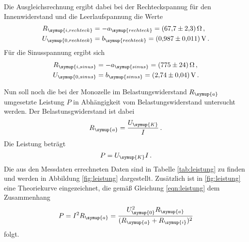 Die Ausgleichsrechnung ergibt dabei bei der Rechteckspannug für den Innenwiderstand
und die Leerlaufspannung die Werte
\begin{align*}
  R_{\symup{i,rechteck}}&=-a_{\symup{rechteck}} = \SI{67.7(23)}{\ohm} \,, \\
  U_{\symup{0,rechteck}}&=b_{\symup{rechteck}} = \SI{0.987(0011)}{\volt} \,.
\end{align*}
Für die Sinusspannung ergibt sich
\begin{align*}
  R_{\symup{i,sinus}}&=-a_{\symup{sinus}} = \SI{775(24)}{\ohm} \,, \\
  U_{\symup{0,sinus}}&=b_{\symup{sinus}} = \SI{2.74(004)}{\volt} \,.
\end{align*}


Nun soll noch die bei der Monozelle im Belastungswiderstand $R_{\symup{a}}$ umgesetzte
Leistung $P$ in Abhängigkeit vom Belastungswiderstand untersucht werden.
Der Belastunsgwiderstand ist dabei
\begin{equation}
  R_{\symup{a}}=\frac{U_{\symup{K}}}{I}\,.
\end{equation}
Die Leistung beträgt
\begin{equation}
  P=U_{\symup{K}}I\,.
\end{equation}
Die aus den Messdaten errechneten Daten sind in Tabelle \ref{tab:leistung} zu finden und
werden in Abbildung \ref{fig:leistung} dargestellt. Zusätzlich ist in \ref{fig:leistung} eine
Theoriekurve eingezeichnet, die gemäß Gleichung \eqref{eqn:leistung} dem Zusammenhang
\begin{equation}
  P=I^2 R_{\symup{a}} = \frac{U_{\symup{0}}^2 R_{\symup{a}}}{(R_{\symup{a}}+R_{\symup{i}})^2}
\end{equation}
folgt.

